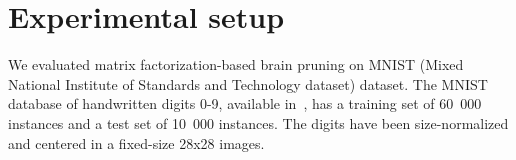 \documentclass{article} %
\begin{document}





\section{Experimental setup}

We evaluated matrix factorization-based brain pruning on MNIST (Mixed National
Institute of Standards and Technology dataset) dataset. The MNIST database of
handwritten digits 0-9, available in~\cite{lecun-mnisthandwrittendigit-2010},
has a training set of 60~000 instances and a test set of 10~000 instances. The
digits have been size-normalized and centered in a fixed-size 28x28 images.
\end{document}
